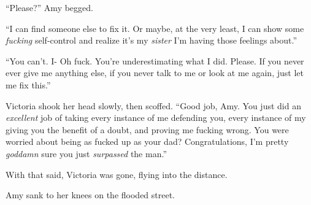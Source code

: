 ``Please?'' Amy begged.



``I can find someone else to fix it.  Or maybe, at the very least, I can show some \emph{fucking} self-control and realize it's my \emph{sister} I'm having those feelings about.''



``You can't.  I- Oh fuck.  You're underestimating what I did.  Please.  If you never ever give me anything else, if you never talk to me or look at me again, just let me fix this.''



Victoria shook her head slowly, then scoffed.  ``Good job, Amy.  You just did an \emph{excellent} job of taking every instance of me defending you, every instance of my giving you the benefit of a doubt, and proving me fucking wrong.  You were worried about being as fucked up as your dad?  Congratulations, I'm pretty \emph{goddamn} sure you just \emph{surpassed} the man.''



With that said, Victoria was gone, flying into the distance.



Amy sank to her knees on the flooded street.





